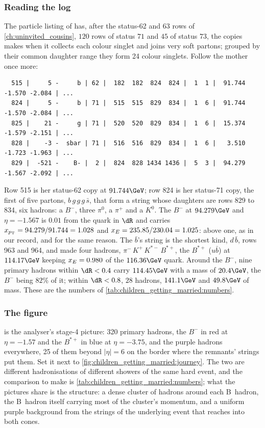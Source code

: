 \subsubsection{Reading the log}

The particle listing of  has, after the
status-62 and 63 rows of \cref{ch:uninvited_cousins}, $120$ rows of status
$71$ and $45$ of status $73$, the copies \PYTHIA makes when it collects
each colour singlet and joins very soft partons; grouped by their common
daughter range they form 24 colour singlets. Follow the mother once more:
\begin{verbatim}
  515 |     5 -     b | 62 |  182  182  824  824 |  1  1 |  91.744  -1.570 -2.084 | ...
  824 |     5 -     b | 71 |  515  515  829  834 |  1  6 |  91.744  -1.570 -2.084 | ...
  825 |    21 -     g | 71 |  520  520  829  834 |  1  6 |  15.374  -1.579 -2.151 | ...
  828 |    -3 -  sbar | 71 |  516  516  829  834 |  1  6 |   3.510  -1.723 -1.963 | ...
  829 |  -521 -    B- |  2 |  824  828 1434 1436 |  5  3 |  94.279  -1.567 -2.092 | ...
\end{verbatim}
Row 515 is her status-62 copy at $91.744\GeV$; row 824 is her status-71
copy, the first of five partons, $b\,g\,g\,g\,\bar s$, that form a string
whose daughters are rows 829 to 834, six hadrons: a $B^-$, three $\pi^0$, a
$\pi^+$ and a $K^0$. The $B^-$ at $94.279\GeV$ and $\eta=-1.567$ is
$0.01$ from the quark in $\dR$ and carries $x_{p_{\mathrm{T}}}=94.279/91.744=1.028$ and
$x_E=235.85/230.04=1.025$: above one, as in our record, and for the same
reason. The $\bar b$'s string is the shortest kind, $d\,\bar b$, rows 963
and 964, and made four hadrons, $\pi^-\,K^+\,K^{*-}\,B^{*+}$, the $B^{*+}$ ($u\bar b$)
at $114.17\GeV$ keeping $x_E=0.980$ of the $116.36\GeV$ quark. Around the
$B^-$, nine primary hadrons within $\dR<0.4$ carry $114.45\GeV$ with a mass
of $20.4\GeV$, the $B^-$ being $82\%$ of it; within $\dR<0.8$, $28$ hadrons,
$141.1\GeV$ and $49.8\GeV$ of mass. These are the \CMSSW numbers of
\cref{tab:children_getting_married:numbers}.

\subsubsection{The figure}

 is the analyser's stage-4 picture:
320 primary hadrons, the $B^-$ in red at $\eta=-1.57$ and the $B^{*+}$ in
blue at $\eta=-3.75$, and the purple hadrons everywhere, 25 of them beyond
$|\eta|=6$ on the border where the remnants' strings put them. Set it next
to \cref{fig:children_getting_married:journey}. The two are different
hadronisations of different showers of the same hard event, and the
comparison to make is \cref{tab:children_getting_married:numbers}; what the
pictures share is the structure: a dense cluster of hadrons around each
B~hadron, the B~hadron itself carrying most of the cluster's momentum, and
a uniform purple background from the strings of the underlying event that
reaches into both cones.

